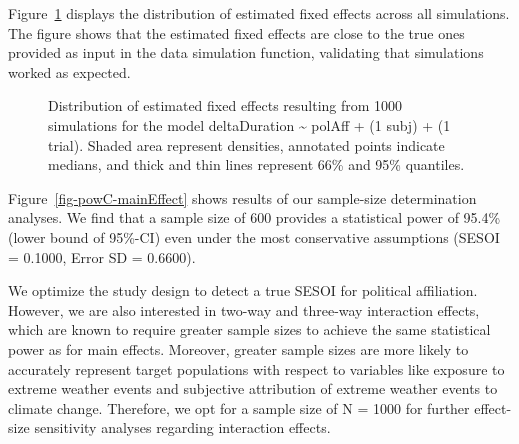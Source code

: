 \documentclass[
  letterpaper,
  DIV=11,
  numbers=noendperiod]{scrartcl}
\begin{document}
Figure~\ref{fig-checkSims-mainEffect} displays the distribution of
estimated fixed effects across all simulations. The figure shows that
the estimated fixed effects are close to the true ones provided as input
in the data simulation function, validating that simulations worked as
expected.

\begin{figure}


\caption{\label{fig-checkSims-mainEffect}Distribution of estimated fixed
effects resulting from 1000 simulations for the model deltaDuration
\textasciitilde{} polAff + (1 \textbar{} subj) + (1 \textbar{} trial).
Shaded area represent densities, annotated points indicate medians, and
thick and thin lines represent 66\% and 95\% quantiles.}

\end{figure}%

Figure~\ref{fig-powC-mainEffect} shows results of our sample-size
determination analyses. We find that a sample size of 600 provides a
statistical power of 95.4\% (lower bound of 95\%-CI) even under the most
conservative assumptions (SESOI = 0.1000, Error SD = 0.6600).

We optimize the study design to detect a true SESOI for political
affiliation. However, we are also interested in two-way and three-way
interaction effects, which are known to require greater sample sizes to
achieve the same statistical power as for main effects. Moreover,
greater sample sizes are more likely to accurately represent target
populations with respect to variables like exposure to extreme weather
events and subjective attribution of extreme weather events to climate
change. Therefore, we opt for a sample size of N = 1000 for further
effect-size sensitivity analyses regarding interaction effects.
\end{document}

